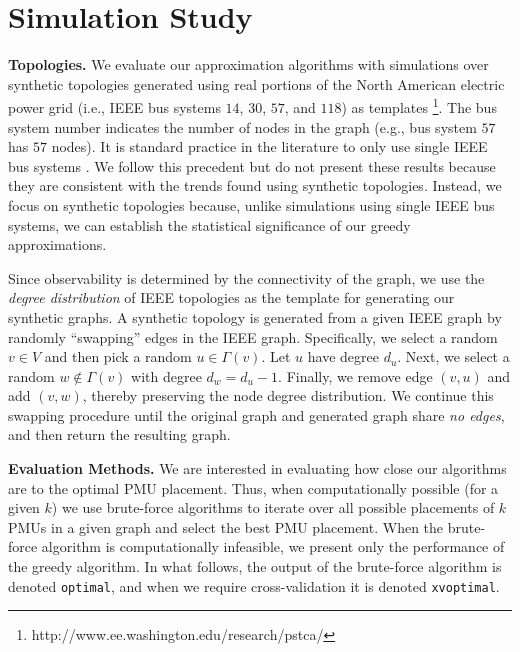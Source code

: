 \section{Simulation Study}
\label{sec:simulations}

\textbf{Topologies.} 
We evaluate our approximation algorithms with simulations over synthetic topologies generated using real portions of the North American electric power grid 
(i.e., IEEE bus systems $14$, $30$, $57$, and $118$) as templates {\footnote {\small http://www.ee.washington.edu/research/pstca/}}. 
The bus system number indicates the number of nodes in the graph (e.g., bus system $57$ has $57$ nodes).
It is standard practice in the literature to only use single IEEE bus systems \cite{Baldwin93,Abur06,Mili90,Xu04}.  
We follow this precedent but do not present these results because they are consistent with the trends found using synthetic topologies.
Instead, we focus on synthetic topologies because, unlike simulations using single IEEE bus systems, we can establish the statistical significance of our greedy approximations.

Since observability is determined by the connectivity of the graph, we use the {\em degree distribution} of IEEE topologies as the template for generating our synthetic graphs.
A synthetic topology is generated from a given IEEE graph by randomly ``swapping'' edges in the IEEE graph. Specifically, we select a random $v \in V$ and then pick a random $u \in \Gamma(v)$. 
Let $u$ have degree $d_u$.  Next, we select a random $w \notin \Gamma(v)$ with degree $d_w = d_u -1$. %
Finally, we remove edge $(v,u)$ and add $(v,w)$, thereby preserving the node degree distribution.
We continue this swapping procedure until the original graph and generated graph share {\em no edges}, and then return the resulting graph.

\textbf{Evaluation Methods.}
We are interested in evaluating how close our algorithms are to the optimal PMU placement. 
Thus, when computationally possible (for a given $k$) we use brute-force algorithms to iterate over all possible placements of $k$ PMUs in a given graph and select the best PMU placement. 
When the brute-force algorithm is computationally infeasible, we present only the performance of the greedy algorithm.
In what follows, the output of the brute-force algorithm is denoted {\tt optimal}, and when we require cross-validation it is denoted {\tt xvoptimal}.


